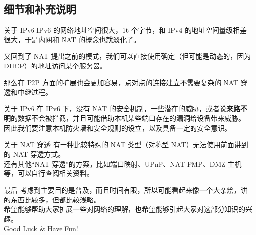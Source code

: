 \subsection{细节和补充说明}

\begin{xframe}{关于 IPv6}
	IPv6 的网络地址空间很大，16 个字节，和 IPv4 的地址空间量级相差很大，于是内网和 NAT 的概念也就淡化了。
	
	又回到了 NAT 提出之前的模式，我们可以直接使用确定（但可能是动态的，因为 DHCP）的地址访问某个服务器。
	
	那么在 P2P 方面的扩展也会更加容易，点对点的连接建立不需要复杂的 NAT 穿透和中继过程。
	
\end{xframe}

\begin{xframe}{关于 IPv6}
	在 IPv6 下，没有 NAT 的安全机制，一些潜在的威胁，或者说\textbf{来路不明}的数据不会被拦截，并且可能借助本机某些端口存在的漏洞给设备带来威胁。\\
	
	因此我们要注意本机防火墙和安全规则的设立，以及具备一定的安全意识。
\end{xframe}

\begin{xframe}{关于 NAT 穿透}
	有一种比较特殊的 NAT 类型（对称型 NAT）无法使用前面讲到的 NAT 穿透方式。\\
	
	还有其他“NAT 穿透”的方案，比如端口映射、UPnP、NAT-PMP、DMZ 主机等，可以自行查阅相关资料。
	
\end{xframe}

\begin{xframe}{最后}
	考虑到主要目的是普及，而且时间有限，所以可能看起来像一个大杂烩，讲的东西比较多，但都比较浅略。\\
	
	希望能够帮助大家扩展一些对网络的理解，也希望能够引起大家对这部分知识的兴趣。\\
	
	Good Luck \& Have Fun!
\end{xframe}


